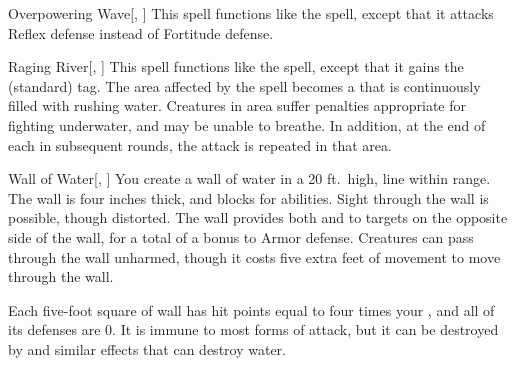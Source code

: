 \lowercase{\hypertarget{spell:Overpowering Wave}{}}\label{spell:Overpowering Wave}
\begin{apability}[\nth{3}]{\hypertarget{spell:Overpowering Wave}{Overpowering Wave}}[, ]
This spell functions like the  spell, except that it attacks Reflex defense instead of Fortitude defense.
\end{apability}
\vspace{0.25em}



\lowercase{\hypertarget{spell:Raging River}{}}\label{spell:Raging River}
\begin{apability}[\nth{3}]{\hypertarget{spell:Raging River}{Raging River}}[, ]
This spell functions like the  spell, except that it gains the  (standard) tag.
The area affected by the spell becomes a  that is continuously filled with rushing water.
Creatures in area suffer penalties appropriate for fighting underwater, and may be unable to breathe.
In addition, at the end of each  in subsequent rounds, the attack is repeated in that area.
\end{apability}
\vspace{0.25em}



\lowercase{\hypertarget{spell:Wall of Water}{}}\label{spell:Wall of Water}
\begin{apability}[\nth{3}]{\hypertarget{spell:Wall of Water}{Wall of Water}}[, ]
You create a wall of water in a 20 ft.\ high, \arealarge line within \rngmed range.
The wall is four inches thick, and blocks  for abilities.
Sight through the wall is possible, though distorted.
The wall provides both  and  to targets on the opposite side of the wall, for a total of a  bonus to Armor defense.
Creatures can pass through the wall unharmed, though it costs five extra feet of movement to move through the wall.

Each five-foot square of wall has hit points equal to four times your , and all of its defenses are 0.
It is immune to most forms of attack, but it can be destroyed by  and similar effects that can destroy water.
\end{apability}
\vspace{0.25em}



